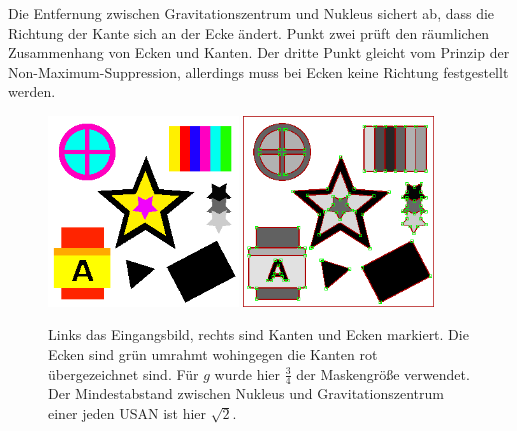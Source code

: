 \documentclass[a4paper, 11pt]{report}
\theoremstyle{definition}
\begin{document}
			Die Entfernung zwischen Gravitationszentrum und Nukleus sichert ab, dass die Richtung der Kante sich an der Ecke ändert. Punkt zwei prüft den räumlichen Zusammenhang von Ecken und Kanten. Der dritte Punkt gleicht vom Prinzip der Non-Maximum-Suppression, allerdings muss bei Ecken keine Richtung festgestellt werden.

			\begin{figure}[H]\centering
				\includegraphics[width=0.45\textwidth]{../examples/original/original.png}\quad
				\includegraphics[width=0.45\textwidth]{../examples/original/test_overlay.png}
				\caption{Links das Eingangsbild, rechts sind Kanten und Ecken markiert. Die Ecken sind grün umrahmt wohingegen die Kanten rot übergezeichnet sind. Für $g$ wurde hier $\frac{3}{4}$ der Maskengröße verwendet. Der Mindestabstand zwischen Nukleus und Gravitationszentrum einer jeden USAN ist hier $\sqrt{2}$.}
				\label{fig:corner_test}
			\end{figure}
\end{document}
